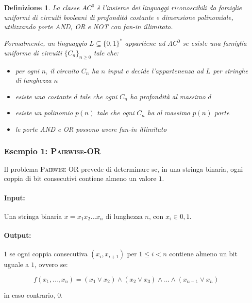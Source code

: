 \documentclass[a4paper,12pt]{report}
\newtheorem{definition}{Definizione}[chapter]
\theoremstyle{propositionstyle}
\begin{document}
    \begin{definition}
        La classe $AC^0$ è l'insieme dei linguaggi riconoscibili da famiglie uniformi di circuiti booleani di profondità costante e dimensione polinomiale, utilizzando porte AND, OR e NOT con fan-in illimitato.

        Formalmente, un linguaggio $L \subseteq \{0,1\}^*$ appartiene ad $AC^0$ se esiste una famiglia uniforme di circuiti $\{C_n\}_{n \geq 0}$ tale che:
        \begin{itemize}
            \item per ogni $n$, il circuito $C_n$ ha $n$ input e decide l'appartenenza ad $L$ per stringhe di lunghezza $n$
            \item esiste una costante $d$ tale che ogni $C_n$ ha profondità al massimo $d$
            \item esiste un polinomio $p(n)$ tale che ogni $C_n$ ha al massimo $p(n)$ porte
            \item le porte AND e OR possono avere fan-in illimitato
        \end{itemize}
    \end{definition}

    \subsubsection{Esempio 1: \textsc{Pairwise-OR}}

    Il problema \textsc{Pairwise-OR} prevede di determinare se, in una stringa binaria, ogni coppia di bit consecutivi contiene almeno un valore $1$.

    \paragraph{Input:}

    Una stringa binaria $x = x_{1}x_{2}\ldots x_{n}$ di lunghezza $n$, con $x_i \in {0,1}$.

    \paragraph{Output:}

    $1$ se ogni coppia consecutiva $(x_i, x_{i+1})$ per $1 \leq i < n$ contiene almeno un bit uguale a $1$, ovvero se:

    \[
        f(x_1, \dots, x_n) = (x_1 \vee x_2) \wedge (x_2 \vee x_3) \wedge \dots \wedge (x_{n-1} \vee x_n)
    \]

    \noindent in caso contrario, $0$.
\end{document}

